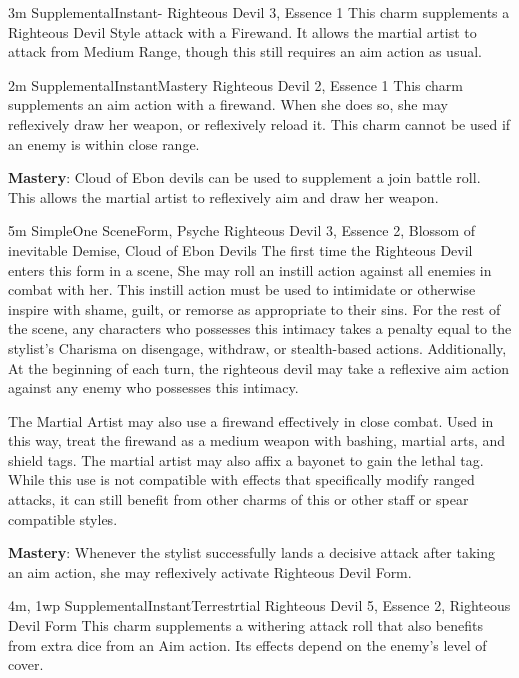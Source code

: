 
{3m}
{Supplemental}{Instant}{-}
{Righteous Devil 3, Essence 1}
This charm supplements a Righteous Devil Style attack with a Firewand.
It allows the martial artist to attack from Medium Range, though this still requires an aim action as usual.

{2m}
{Supplemental}{Instant}{Mastery}
{Righteous Devil 2, Essence 1}
This charm supplements an aim action with a firewand.
When she does so, she may reflexively draw her weapon, or reflexively reload it.
This charm cannot be used if an enemy is within close range.

\textbf{Mastery}: Cloud of Ebon devils can be used to supplement a join battle roll.
This allows the martial artist to reflexively aim and draw her weapon.

 
{5m}
{Simple}{One Scene}{Form, Psyche}
{Righteous Devil 3, Essence 2, Blossom of inevitable Demise, Cloud of Ebon Devils}
The first time the Righteous Devil enters this form in a scene,
She may roll an instill action against all enemies in combat with her.
This instill action must be used to intimidate or otherwise inspire with shame, guilt, or remorse as appropriate to their sins.
For the rest of the scene, any characters who possesses this intimacy takes a penalty equal to the stylist's Charisma on disengage, withdraw, or stealth-based actions.
Additionally, At the beginning of each turn, the righteous devil may take a reflexive aim action against any enemy who possesses this intimacy.

The Martial Artist may also use a firewand effectively in close combat.
Used in this way, treat the firewand as a medium weapon with bashing, martial arts, and shield tags.
The martial artist may also affix a bayonet to gain the lethal tag.
While this use is not compatible with effects that specifically modify ranged attacks, it can still benefit from other charms of this or other staff or spear compatible styles.

\textbf{Mastery}: Whenever the stylist successfully lands a decisive attack after taking an aim action,
she may reflexively activate Righteous Devil Form.

{4m, 1wp}
{Supplemental}{Instant}{Terrestrtial}
{Righteous Devil 5, Essence 2, Righteous Devil Form}
This charm supplements a withering attack roll that also benefits from extra dice from an Aim action.
Its effects depend on the enemy's level of cover.


